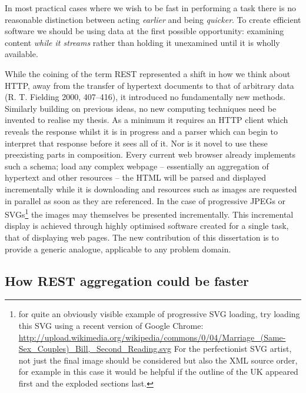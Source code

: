 \documentclass[12pt, ]{article}
\begin{document}
In most practical cases where we wish to be fast in performing a task
there is no reasonable distinction between acting \emph{earlier} and
being \emph{quicker}. To create efficient software we should be using
data at the first possible opportunity: examining content \emph{while it
streams} rather than holding it unexamined until it is wholly available.

While the coining of the term REST represented a shift in how we think
about HTTP, away from the transfer of hypertext documents to that of
arbitrary data (R. T. Fielding 2000, 407--416), it introduced no
fundamentally new methods. Similarly building on previous ideas, no new
computing techniques need be invented to realise my thesis. As a minimum
it requires an HTTP client which reveals the response whilst it is in
progress and a parser which can begin to interpret that response before
it sees all of it. Nor is it novel to use these preexisting parts in
composition. Every current web browser already implements such a schema;
load any complex webpage -- essentially an aggregation of hypertext and
other resources -- the HTML will be parsed and displayed incrementally
while it is downloading and resources such as images are requested in
parallel as soon as they are referenced. In the case of progressive
JPEGs or SVGs\footnote{for quite an obviously visible example of
  progressive SVG loading, try loading this SVG using a recent version
  of Google Chrome:
  \url{http://upload.wikimedia.org/wikipedia/commons/0/04/Marriage_(Same-Sex_Couples)_Bill,_Second_Reading.svg}
  For the perfectionist SVG artist, not just the final image should be
  considered but also the XML source order, for example in this case it
  would be helpful if the outline of the UK appeared first and the
  exploded sections last.} the images may themselves be presented
incrementally. This incremental display is achieved through highly
optimised software created for a single task, that of displaying web
pages. The new contribution of this dissertation is to provide a generic
analogue, applicable to any problem domain.

\subsection{How REST aggregation could be
faster}\label{how-rest-aggregation-could-be-faster}
\end{document}
